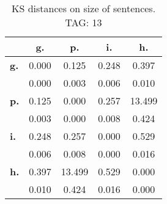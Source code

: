 \begin{table}[h!]
\begin{center}
\begin{tabular}{| l || c | c | c | c |}\hline
 & {\bf g.} & {\bf p.} & {\bf i.} & {\bf h.} \\\hline\hline
{\bf g.} & 0.000 & 0.125 & 0.248 & 0.397 \\
{\bf } & 0.000 & 0.003 & 0.006 & 0.010 \\\hline
{\bf p.} & 0.125 & 0.000 & 0.257 & 13.499 \\
{\bf } & 0.003 & 0.000 & 0.008 & 0.424 \\\hline
{\bf i.} & 0.248 & 0.257 & 0.000 & 0.529 \\
{\bf } & 0.006 & 0.008 & 0.000 & 0.016 \\\hline
{\bf h.} & 0.397 & 13.499 & 0.529 & 0.000 \\
{\bf } & 0.010 & 0.424 & 0.016 & 0.000 \\\hline
\end{tabular}
\caption{KS distances on size of sentences. TAG: 13}
\end{center}
\end{table}